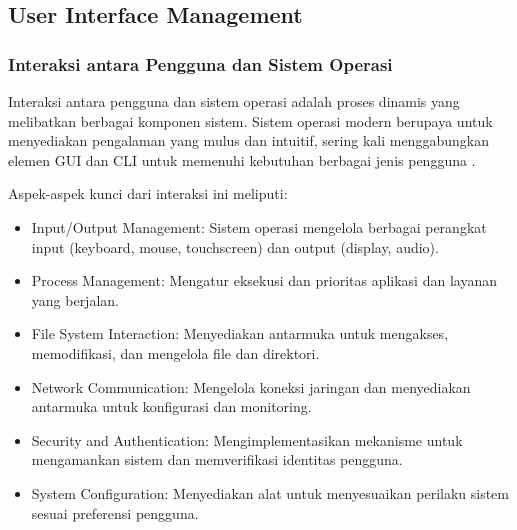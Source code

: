 \documentclass[12pt]{article}
\begin{document}
	\subsection{User Interface Management}
	\subsubsection{Interaksi antara Pengguna dan Sistem Operasi}
	
	Interaksi antara pengguna dan sistem operasi adalah proses dinamis yang melibatkan berbagai komponen sistem. Sistem operasi modern berupaya untuk menyediakan pengalaman yang mulus dan intuitif, sering kali menggabungkan elemen GUI dan CLI untuk memenuhi kebutuhan berbagai jenis pengguna \cite{Tanenbaum2015}.
	
	Aspek-aspek kunci dari interaksi ini meliputi:
	\begin{itemize}
		\item Input/Output Management: Sistem operasi mengelola berbagai perangkat input (keyboard, mouse, touchscreen) dan output (display, audio).
		\item Process Management: Mengatur eksekusi dan prioritas aplikasi dan layanan yang berjalan.
		\item File System Interaction: Menyediakan antarmuka untuk mengakses, memodifikasi, dan mengelola file dan direktori.
		\item Network Communication: Mengelola koneksi jaringan dan menyediakan antarmuka untuk konfigurasi dan monitoring.
		\item Security and Authentication: Mengimplementasikan mekanisme untuk mengamankan sistem dan memverifikasi identitas pengguna.
		\item System Configuration: Menyediakan alat untuk menyesuaikan perilaku sistem sesuai preferensi pengguna.
	\end{itemize}
	
\end{document}
